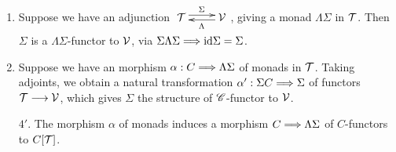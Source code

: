 \documentclass[11pt]{article}
\begin{document}
\begin{chapter7-9}
\begin{itemise}
\begin{exmps*}[9.5]
\begin{enumerate}
\item Suppose we have an adjunction $\xymatrix@R=.3cm{
\calT  \ar@<.6ex>[r]^{\Sigma}&
\calV  \ar@<.4ex>[l]^{\Lambda}}$, giving a monad $\Lambda\Sigma$ in $\mathcal{T}$. Then $\Sigma$ is a $\Lambda\Sigma$-functor to $\mathcal{V}$, via $\Sigma\Lambda\Sigma\Longrightarrow \textup{id}\Sigma=\Sigma$.
\item Suppose we have an morphism $\alpha:C\Longrightarrow\Lambda\Sigma$ of monads in $\mathcal{T}$. Taking adjoints, we obtain a natural transformation $\alpha':\Sigma C\Longrightarrow \Sigma$ of functors $\mathcal{T}\longrightarrow\mathcal{V}$, which gives $\Sigma$ the structure of $\mathscr{C}$-functor to $\mathcal{V}$. 
\item[$4'$.] The morphism $\alpha$ of monads induces a morphism $C\Longrightarrow\Lambda\Sigma$ of $C$-functors to $C[\mathcal{T}]$.
\end{enumerate}
\end{exmps*}

\end{itemise}
\end{chapter7-9}
\end{document}
